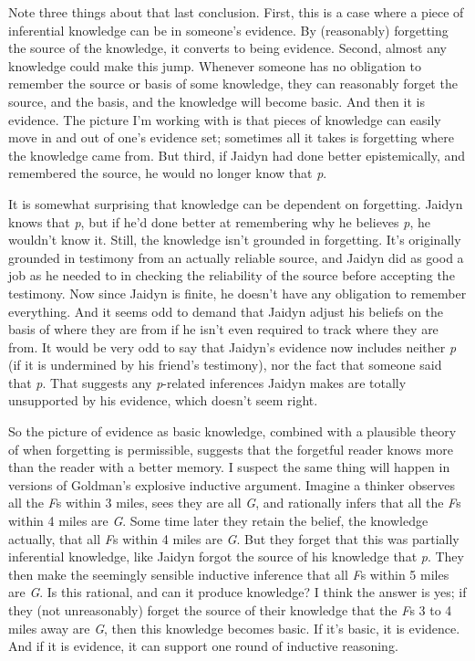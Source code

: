 \documentclass[
  12pt,
  letterpaper,
]{scrbook}
\begin{document}
Note three things about that last conclusion. First, this is a case
where a piece of inferential knowledge can be in someone's evidence. By
(reasonably) forgetting the source of the knowledge, it converts to
being evidence. Second, almost any knowledge could make this jump.
Whenever someone has no obligation to remember the source or basis of
some knowledge, they can reasonably forget the source, and the basis,
and the knowledge will become basic. And then it is evidence. The
picture I'm working with is that pieces of knowledge can easily move in
and out of one's evidence set; sometimes all it takes is forgetting
where the knowledge came from. But third, if Jaidyn had done better
epistemically, and remembered the source, he would no longer know that
\emph{p}.

It is somewhat surprising that knowledge can be dependent on forgetting.
Jaidyn knows that \emph{p}, but if he'd done better at remembering why
he believes \emph{p}, he wouldn't know it. Still, the knowledge isn't
grounded in forgetting. It's originally grounded in testimony from an
actually reliable source, and Jaidyn did as good a job as he needed to
in checking the reliability of the source before accepting the
testimony. Now since Jaidyn is finite, he doesn't have any obligation to
remember everything. And it seems odd to demand that Jaidyn adjust his
beliefs on the basis of where they are from if he isn't even required to
track where they are from. It would be very odd to say that Jaidyn's
evidence now includes neither \emph{p} (if it is undermined by his
friend's testimony), nor the fact that someone said that \emph{p}. That
suggests any \emph{p}-related inferences Jaidyn makes are totally
unsupported by his evidence, which doesn't seem right.

So the picture of evidence as basic knowledge, combined with a plausible
theory of when forgetting is permissible, suggests that the forgetful
reader knows more than the reader with a better memory. I suspect the
same thing will happen in versions of Goldman's explosive inductive
argument. Imagine a thinker observes all the \emph{F}s within 3 miles,
sees they are all \emph{G}, and rationally infers that all the \emph{F}s
within 4 miles are \emph{G}. Some time later they retain the belief, the
knowledge actually, that all \emph{F}s within 4 miles are \emph{G}. But
they forget that this was partially inferential knowledge, like Jaidyn
forgot the source of his knowledge that \emph{p}. They then make the
seemingly sensible inductive inference that all \emph{F}s within 5 miles
are \emph{G}. Is this rational, and can it produce knowledge? I think
the answer is yes; if they (not unreasonably) forget the source of their
knowledge that the \emph{F}s 3 to 4 miles away are \emph{G}, then this
knowledge becomes basic. If it's basic, it is evidence. And if it is
evidence, it can support one round of inductive reasoning.
\end{document}
